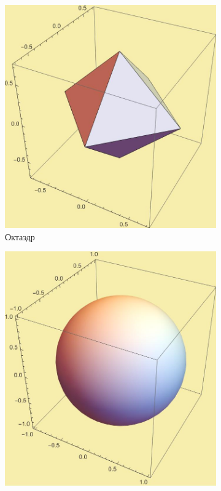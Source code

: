 \documentclass[12pt, a4paper]{article}
\begin{document}
\begin{enumerate}
		\begin{figure}
			\centering
			\begin{subfigure}{0.3\textwidth}
				\includegraphics[width=\textwidth]{octahedron}
				\caption{Октаэдр}
				\label{fig:first}
			\end{subfigure}
			\hfill
			\begin{subfigure}{0.3\textwidth}
				\includegraphics[width=\textwidth]{ball}

\end{subfigure}
\end{figure}
\end{enumerate}
\end{document}
